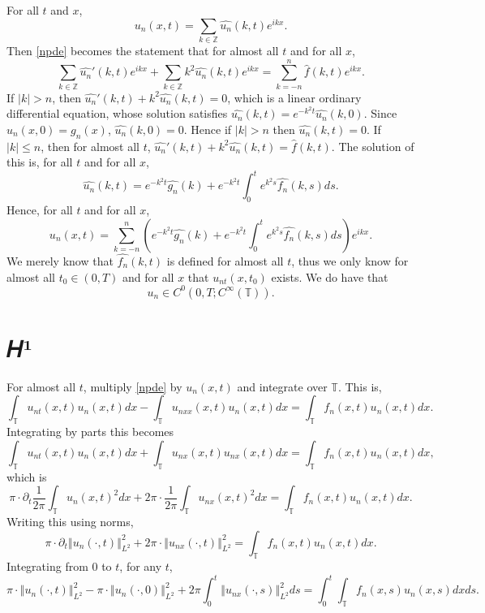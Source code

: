 \documentclass{article}
\newcommand{\norm}[1]{\left\Vert #1 \right\Vert}
\begin{document}
For all $t$ and $x$,
\[
u_n(x,t)=\sum_{k \in \mathbb{Z}} \widehat{u_n}(k,t) e^{ikx}.
\]
Then \eqref{npde} becomes the statement that for almost all $t$ and for all $x$,
\[
\sum_{k \in \mathbb{Z}} \widehat{u_n}'(k,t) e^{ikx} + \sum_{k \in \mathbb{Z}} k^2 \widehat{u_n}(k,t) e^{ikx}
=\sum_{k=-n}^n \hat{f}(k,t) e^{ikx}.
\]
If $|k| >n$, then $\widehat{u_n}'(k,t) + k^2 \widehat{u_n}(k,t) = 0$, which  is a linear ordinary differential equation,  whose
solution satisfies $\widehat{u_n}(k,t)=e^{-k^2 t} \widehat{u_n}(k,0)$. Since $u_n(x,0)=g_n(x)$, $\widehat{u_n}(k,0)=0$. Hence
if $|k|>n$ then $\widehat{u_n}(k,t)=0$. If $|k| \leq n$, then for almost all $t$, $\widehat{u_n}'(k,t) + k^2 \widehat{u_n}(k,t) = \hat{f}(k,t)$.
The solution of this is, for all $t$ and for all $x$,
\[
\widehat{u_n}(k,t)=e^{-k^2 t} \widehat{g_n}(k) + e^{-k^2 t}  \int_0^t e^{k^2 s} \widehat{f_n}(k,s) ds.
\]
Hence, for  all $t$ and for all $x$,
\[
u_n(x,t)=\sum_{k=-n}^n \left(e^{-k^2 t} \widehat{g_n}(k) + e^{-k^2 t}  \int_0^t e^{k^2 s} \widehat{f_n}(k,s) ds\right) e^{ikx}.
\]
We merely know
that $\widehat{f_n}(k,t)$ is defined for almost all $t$, thus we only know 
for almost all $t_0 \in (0,T)$ and for all $x$ that $u_{nt}(x,t_0)$ exists. We do have that 
\[
u_n \in C^0(0,T;C^\infty(\mathbb{T})).
\]

\section{𝐻¹}
For almost all $t$, multiply \eqref{npde} by $u_n(x,t)$ and integrate over $\mathbb{T}$. This is,
\[
\int_\mathbb{T} u_{nt}(x,t)u_n(x,t) dx- \int_\mathbb{T} u_{nxx}(x,t) u_n(x,t) dx = \int_\mathbb{T} f_n(x,t) u_n(x,t) dx.
\]
Integrating by parts this becomes
\[
\int_\mathbb{T} u_{nt}(x,t) u_n(x,t) dx + \int_\mathbb{T} u_{nx}(x,t) u_{nx}(x,t) dx = \int_\mathbb{T} f_n(x,t) u_n(x,t) dx,
\]
which is
\[
\pi \cdot \partial_t \frac{1}{2\pi} \int_\mathbb{T} u_n(x,t)^2 dx + 2\pi \cdot \frac{1}{2\pi} \int_\mathbb{T} u_{nx}(x,t)^2 dx = \int_\mathbb{T} f_n(x,t) u_n(x,t) dx.
\]
Writing this using norms,
\[
\pi \cdot \partial_t \norm{u_n(\cdot,t)}_{L^2}^2 + 2\pi \cdot \norm{u_{nx}(\cdot,t)}_{L^2}^2 =  \int_\mathbb{T} f_n(x,t) u_n(x,t) dx.
\]
Integrating from $0$ to $t$, for any $t$,
\[
\pi \cdot \norm{u_n(\cdot,t)}_{L^2}^2 - \pi \cdot \norm{u_n(\cdot,0)}_{L^2}^2
+ 2\pi \int_0^t \norm{u_{nx}(\cdot,s)}_{L^2}^2 ds = \int_0^t  \int_\mathbb{T} f_n(x,s) u_n(x,s) dx ds.
\]
\end{document}
